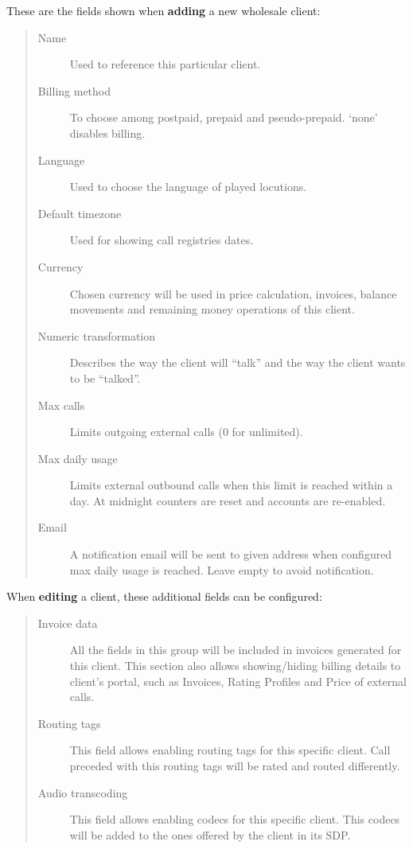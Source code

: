 \documentclass[letterpaper,10pt,spanish]{sphinxmanual}
\begin{document}
These are the fields shown when \textbf{adding} a new wholesale client:
\begin{quote}
\begin{description}
\item[{Name}] \leavevmode
Used to reference this particular client.

\item[{Billing method}] \leavevmode
To choose among postpaid, prepaid and pseudo-prepaid. `none' disables billing.

\item[{Language}] \leavevmode
Used to choose the language of played locutions.

\item[{Default timezone}] \leavevmode
Used for showing call registries dates.

\item[{Currency}] \leavevmode
Chosen currency will be used in price calculation, invoices, balance movements and
remaining money operations of this client.

\item[{Numeric transformation}] \leavevmode
Describes the way the client will ``talk'' and the way the client wants to be ``talked''.

\item[{Max calls}] \leavevmode
Limits outgoing external calls (0 for unlimited).

\item[{Max daily usage}] \leavevmode
Limits external outbound calls when this limit is reached within a day. At midnight counters are reset and
accounts are re-enabled.

\item[{Email}] \leavevmode
A notification email will be sent to given address when configured max daily usage is reached. Leave empty to
avoid notification.

\end{description}
\end{quote}

When \textbf{editing} a client, these additional fields can be configured:
\begin{quote}
\begin{description}
\item[{Invoice data}] \leavevmode
All the fields in this group will be included in invoices generated for this client. This section also allows
showing/hiding billing details to client's portal, such as Invoices, Rating Profiles and Price of external calls.

\item[{Routing tags}] \leavevmode
This field allows enabling routing tags for this specific client. Call preceded with this
routing tags will be rated and routed differently.

\item[{Audio transcoding}] \leavevmode
This field allows enabling codecs for this specific client. This codecs will be added to
the ones offered by the client in its SDP.

\end{description}
\end{quote}
\end{document}
